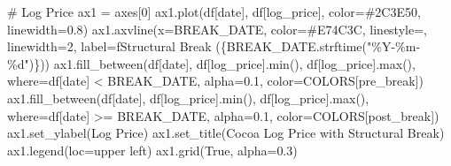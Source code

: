 \documentclass[
  letterpaper,
  DIV=11,
  numbers=noendperiod]{scrartcl}
\newenvironment{Shaded}{\begin{snugshade}}{\end{snugshade}}
\newcommand{\BuiltInTok}[1]{\textcolor[rgb]{0.00,0.23,0.31}{#1}}
\newcommand{\CommentTok}[1]{\textcolor[rgb]{0.37,0.37,0.37}{#1}}
\newcommand{\DecValTok}[1]{\textcolor[rgb]{0.68,0.00,0.00}{#1}}
\newcommand{\FloatTok}[1]{\textcolor[rgb]{0.68,0.00,0.00}{#1}}
\newcommand{\NormalTok}[1]{\textcolor[rgb]{0.00,0.23,0.31}{#1}}
\newcommand{\OperatorTok}[1]{\textcolor[rgb]{0.37,0.37,0.37}{#1}}
\newcommand{\SpecialCharTok}[1]{\textcolor[rgb]{0.37,0.37,0.37}{#1}}
\newcommand{\SpecialStringTok}[1]{\textcolor[rgb]{0.13,0.47,0.30}{#1}}
\newcommand{\StringTok}[1]{\textcolor[rgb]{0.13,0.47,0.30}{#1}}
\newcommand{\VariableTok}[1]{\textcolor[rgb]{0.07,0.07,0.07}{#1}}
\begin{document}
\begin{Shaded}
\begin{Highlighting}[]
\CommentTok{\# Log Price}
\NormalTok{ax1 }\OperatorTok{=}\NormalTok{ axes[}\DecValTok{0}\NormalTok{]}
\NormalTok{ax1.plot(df[}\StringTok{\textquotesingle{}date\textquotesingle{}}\NormalTok{], df[}\StringTok{\textquotesingle{}log\_price\textquotesingle{}}\NormalTok{], color}\OperatorTok{=}\StringTok{\textquotesingle{}\#2C3E50\textquotesingle{}}\NormalTok{, linewidth}\OperatorTok{=}\FloatTok{0.8}\NormalTok{)}
\NormalTok{ax1.axvline(x}\OperatorTok{=}\NormalTok{BREAK\_DATE, color}\OperatorTok{=}\StringTok{\textquotesingle{}\#E74C3C\textquotesingle{}}\NormalTok{, linestyle}\OperatorTok{=}\StringTok{\textquotesingle{}{-}{-}\textquotesingle{}}\NormalTok{, linewidth}\OperatorTok{=}\DecValTok{2}\NormalTok{,}
\NormalTok{            label}\OperatorTok{=}\SpecialStringTok{f\textquotesingle{}Structural Break (}\SpecialCharTok{\{}\NormalTok{BREAK\_DATE}\SpecialCharTok{.}\NormalTok{strftime(}\StringTok{"\%Y{-}\%m{-}}\SpecialCharTok{\%d}\StringTok{"}\NormalTok{)}\SpecialCharTok{\}}\SpecialStringTok{)\textquotesingle{}}\NormalTok{)}
\NormalTok{ax1.fill\_between(df[}\StringTok{\textquotesingle{}date\textquotesingle{}}\NormalTok{], df[}\StringTok{\textquotesingle{}log\_price\textquotesingle{}}\NormalTok{].}\BuiltInTok{min}\NormalTok{(), df[}\StringTok{\textquotesingle{}log\_price\textquotesingle{}}\NormalTok{].}\BuiltInTok{max}\NormalTok{(),}
\NormalTok{                 where}\OperatorTok{=}\NormalTok{df[}\StringTok{\textquotesingle{}date\textquotesingle{}}\NormalTok{] }\OperatorTok{\textless{}}\NormalTok{ BREAK\_DATE, alpha}\OperatorTok{=}\FloatTok{0.1}\NormalTok{, color}\OperatorTok{=}\NormalTok{COLORS[}\StringTok{\textquotesingle{}pre\_break\textquotesingle{}}\NormalTok{])}
\NormalTok{ax1.fill\_between(df[}\StringTok{\textquotesingle{}date\textquotesingle{}}\NormalTok{], df[}\StringTok{\textquotesingle{}log\_price\textquotesingle{}}\NormalTok{].}\BuiltInTok{min}\NormalTok{(), df[}\StringTok{\textquotesingle{}log\_price\textquotesingle{}}\NormalTok{].}\BuiltInTok{max}\NormalTok{(),}
\NormalTok{                 where}\OperatorTok{=}\NormalTok{df[}\StringTok{\textquotesingle{}date\textquotesingle{}}\NormalTok{] }\OperatorTok{\textgreater{}=}\NormalTok{ BREAK\_DATE, alpha}\OperatorTok{=}\FloatTok{0.1}\NormalTok{, color}\OperatorTok{=}\NormalTok{COLORS[}\StringTok{\textquotesingle{}post\_break\textquotesingle{}}\NormalTok{])}
\NormalTok{ax1.set\_ylabel(}\StringTok{\textquotesingle{}Log Price\textquotesingle{}}\NormalTok{)}
\NormalTok{ax1.set\_title(}\StringTok{\textquotesingle{}Cocoa Log Price with Structural Break\textquotesingle{}}\NormalTok{)}
\NormalTok{ax1.legend(loc}\OperatorTok{=}\StringTok{\textquotesingle{}upper left\textquotesingle{}}\NormalTok{)}
\NormalTok{ax1.grid(}\VariableTok{True}\NormalTok{, alpha}\OperatorTok{=}\FloatTok{0.3}\NormalTok{)}


\end{Highlighting}
\end{Shaded}
\end{document}
